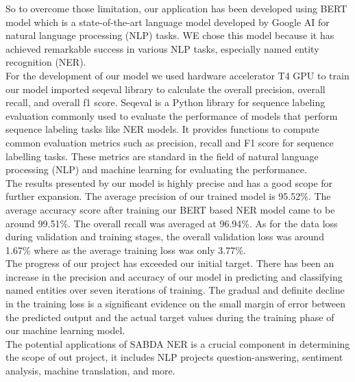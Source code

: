 So to overcome those limitation, our application has been developed using BERT model which is a state-of-the-art language model developed by Google AI for natural language processing (NLP) tasks. 
WE chose this model because it has achieved remarkable success in various NLP tasks, especially named entity recognition (NER). \\

For the development of our model we used hardware accelerator T4 GPU to train our model imported seqeval library to calculate the overall precision, overall recall, and overall f1 score. Seqeval is a Python library for sequence labeling evaluation commonly used to evaluate the performance of models that perform sequence labeling tasks like NER models. It provides functions to compute common evaluation metrics such as precision, recall and F1 score for sequence labelling tasks. These metrics are standard in the field of natural language processing (NLP) and machine learning for evaluating the performance.\\

The results presented by our model is highly precise and has a good scope for further expansion. The average precision of our trained model is  95.52\%. The average accuracy score after training our BERT based NER model came to be around 99.51\%. The overall recall was averaged at 96.94\%. As for the data loss during validation and training stages, the overall validation loss was around 1.67\% where as the average training loss was only 3.77\%. \\

The progress of our project has exceeded our initial target. There has been an increase in the precision and accuracy of our model in predicting and classifying named entities over seven iterations of training. The gradual and definite decline in the training loss is a significant evidence on the small margin of error between the predicted output and the actual target values during the training phase of our machine learning model.\\

The potential applications of SABDA NER is a crucial component in determining the scope of out project, it includes NLP projects question-answering, sentiment analysis, machine translation, and more.



